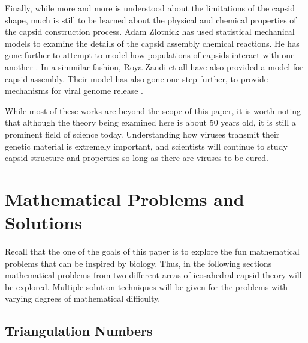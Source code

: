 \documentclass[12pt,letter]{article}
\begin{document}
Finally, while more and more is understood about the limitations of the capsid shape, much is still to be learned about the physical and chemical properties of the capsid construction process. Adam Zlotnick has used statistical mechanical models to examine the details of the capsid assembly chemical reactions. He has gone further to attempt to model how populations of capsids interact with one another \cite{Zlotnick:2005}. In a simmilar fashion, Roya Zandi et all have also provided a model for capsid assembly. Their model has also gone one step further, to provide mechanisms for viral genome release \cite{Zandi:2004}.

While most of these works are beyond the scope of this paper, it is worth noting that although the theory being examined here is about 50 years old, it is still a prominent field of science today. Understanding how viruses transmit their genetic material is extremely important, and scientists will continue to study capsid structure and properties so long as there are viruses to be cured.

\section{Mathematical Problems and Solutions} %
Recall that the one of the goals of this paper is to explore the fun mathematical problems that can be inspired by biology. Thus, in the following sections mathematical problems from two different areas of icosahedral capsid theory will be explored. Multiple solution techniques will be given for the problems with varying degrees of mathematical difficulty.

\subsection{Triangulation Numbers} %
\end{document}
